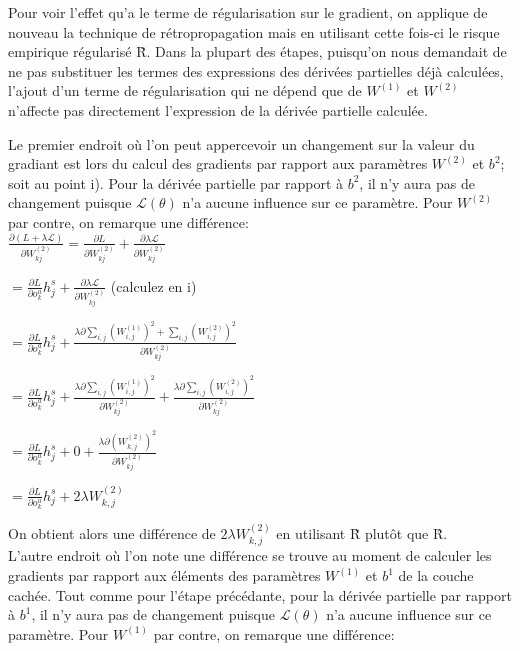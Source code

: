 \documentclass[a4paper,10pt]{article}
\begin{document}
Pour voir l'effet qu'a le terme de régularisation sur le gradient, on applique de nouveau la technique de rétropropagation mais en utilisant cette fois-ci le risque empirique régularisé \~{R}. Dans la plupart des étapes, puisqu'on nous demandait de ne pas substituer les termes des expressions des dérivées partielles déjà calculées, l'ajout d'un terme de régularisation qui ne dépend que de $W^{(1)}$ et $W^{(2)}$ n'affecte pas directement l'expression de la dérivée partielle calculée.

Le premier endroit où l'on peut appercevoir un changement sur la valeur du gradiant est lors du calcul des gradients par rapport aux paramètres $W^{(2)}$ et $b^2$; soit au point i). Pour la dérivée partielle par rapport à $b^2$, il n'y aura pas de changement puisque $\mathcal{L}(\theta)$ n'a aucune influence sur ce paramètre. Pour $W^{(2)}$ par contre, on remarque une différence:\\

$\frac{\partial (L+\lambda \mathcal{L})}{\partial W_{kj}^{(2)}} = \frac{\partial L}{\partial W_{kj}^{(2)}}+\frac{\partial \lambda \mathcal{L}}{\partial W_{kj}^{(2)}}$

$= \frac{\partial L}{\partial o_{k}^a} h_j^s+\frac{\partial \lambda \mathcal{L}}{\partial W_{kj}^{(2)}}$ (calculez en i)

$= \frac{\partial L}{\partial o_{k}^a} h_j^s+\frac{\lambda \partial \sum_{i,j} (W_{i,j}^{(1)})^2 + \sum_{i,j} (W_{i,j}^{(2)})^2}{\partial W_{kj}^{(2)}}$

$= \frac{\partial L}{\partial o_{k}^a} h_j^s+\frac{\lambda \partial \sum_{i,j} (W_{i,j}^{(1)})^2}{\partial W_{kj}^{(2)}}+\frac{\lambda \partial \sum_{i,j} (W_{i,j}^{(2)})^2}{\partial W_{kj}^{(2)}}$

$= \frac{\partial L}{\partial o_{k}^a} h_j^s+0+\frac{\lambda \partial (W_{k,j}^{(2)})^2}{\partial W_{kj}^{(2)}}$

$= \frac{\partial L}{\partial o_{k}^a} h_j^s+2 \lambda W_{k,j}^{(2)}$


On obtient alors une différence de $2 \lambda W_{k,j}^{(2)}$ en utilisant \~{R} plutôt que \^{R}.\\

L'autre endroit où l'on note une différence se trouve au moment de calculer les gradients par rapport aux éléments des paramètres $W^{(1)}$ et $b^1$ de la couche cachée. Tout comme pour l'étape précédante, pour la dérivée partielle par rapport à $b^1$, il n'y aura pas de changement puisque $\mathcal{L}(\theta)$ n'a aucune influence sur ce paramètre. Pour $W^{(1)}$ par contre, on remarque une différence:\\
\end{document}
